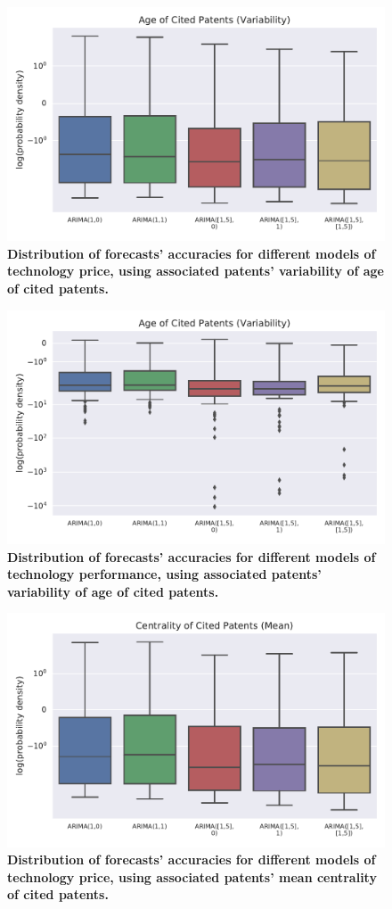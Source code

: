 \documentclass{article}
\begin{document}
\begin{figure}
    \centering
    \includegraphics[width=.75\textwidth]{figs/VAR_Model_Prediction_Citations_Backward_Age_STD_Price.pdf}
    \caption{\textbf{Distribution of forecasts' accuracies for different models of technology price, using associated patents' variability of age of cited patents.}}
    \label{VAR_Model_Prediction_Citations_Backward_Age_STD_Price}
\end{figure}

\begin{figure}
    \centering
    \includegraphics[width=.75\textwidth]{figs/VAR_Model_Prediction_Citations_Backward_Age_STD_Performance.pdf}
    \caption{\textbf{Distribution of forecasts' accuracies for different models of technology performance, using associated patents' variability of age of cited patents.}}
    \label{VAR_Model_Prediction_Citations_Backward_Age_STD_Performance}
\end{figure}

\begin{figure}
    \centering
    \includegraphics[width=.75\textwidth]{figs/VAR_Model_Prediction_meanSPNPcited_1year_before_Price.pdf}
    \caption{\textbf{Distribution of forecasts' accuracies for different models of technology price, using associated patents' mean centrality of cited patents.}}
    \label{VAR_Model_Prediction_meanSPNPcited_1year_before_Price}
\end{figure}
\end{document}
